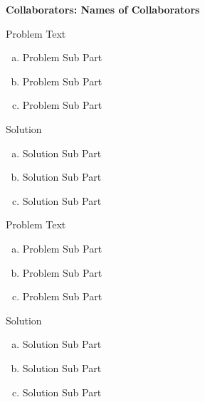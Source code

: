 \documentclass[11pt]{cubouldpset}
\newcommand{\collaborators}[1]{\textbf{Collaborators: #1}}
\begin{document}
\collaborators{Names of Collaborators}

\begin{problem} 

Problem Text
\begin{enumerate}[(a)]

\item Problem Sub Part

\item Problem Sub Part

\item Problem Sub Part

\end{enumerate}
\end{problem}

\begin{solution}
Solution
\begin{enumerate}[(a)]
%
\item Solution Sub Part
\item Solution Sub Part
\item Solution Sub Part
\end{enumerate}
\end{solution}

\newpage

\begin{problem} 

Problem Text
\begin{enumerate}[(a)]

\item Problem Sub Part

\item Problem Sub Part

\item Problem Sub Part

\end{enumerate}
\end{problem}

\begin{solution}
Solution
\begin{enumerate}[(a)]
%
\item Solution Sub Part
\item Solution Sub Part
\item Solution Sub Part
\end{enumerate}
\end{solution}
\end{document}
